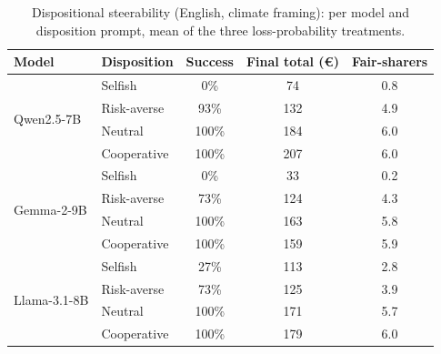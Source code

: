 \begin{table}[t]\centering
\caption{Dispositional steerability (English, climate framing): per model and disposition prompt, mean of the three loss-probability treatments.}
\label{tab:si_personality}
\begin{tabular}{llccc}\toprule
Model & Disposition & Success & Final total (\euro) & Fair-sharers \\\midrule
\multirow{4}{*}{Qwen2.5-7B} & Selfish & 0\% & 74 & 0.8 \\
 & Risk-averse & 93\% & 132 & 4.9 \\
 & Neutral & 100\% & 184 & 6.0 \\
 & Cooperative & 100\% & 207 & 6.0 \\
\midrule
\multirow{4}{*}{Gemma-2-9B} & Selfish & 0\% & 33 & 0.2 \\
 & Risk-averse & 73\% & 124 & 4.3 \\
 & Neutral & 100\% & 163 & 5.8 \\
 & Cooperative & 100\% & 159 & 5.9 \\
\midrule
\multirow{4}{*}{Llama-3.1-8B} & Selfish & 27\% & 113 & 2.8 \\
 & Risk-averse & 73\% & 125 & 3.9 \\
 & Neutral & 100\% & 171 & 5.7 \\
 & Cooperative & 100\% & 179 & 6.0 \\
\bottomrule\end{tabular}\end{table}
